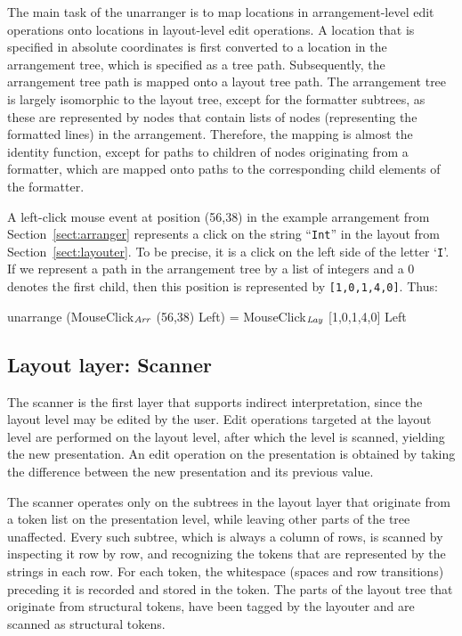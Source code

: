 \documentclass{speauth}
\begin{document}
The main task of the unarranger is to map locations in arrangement-level edit operations onto locations in layout-level edit operations. A location that is specified in absolute coordinates is first converted to a location in the arrangement tree, which is specified as a tree path. Subsequently, the arrangement tree path is mapped onto a layout tree path. The arrangement tree is largely isomorphic to the layout tree, except for the formatter subtrees, as these are represented by nodes that contain lists of nodes (representing the formatted lines) in the arrangement. Therefore, the mapping is almost the identity function, except for paths to children of nodes originating from a formatter, which are mapped onto paths to the corresponding child elements of the formatter.

A left-click mouse event at position (56,38) in the example arrangement from Section~\ref{sect:arranger} represents a click on the string ``\verb|Int|'' in the layout from Section~\ref{sect:layouter}. To be precise, it is a click on the left side of the letter `\verb|I|'. If we represent a path in the arrangement tree by a list of integers and a 0 denotes the first child, then this position is represented by \verb|[1,0,1,4,0]|. Thus:

\small \ttfamily
unarrange (MouseClick$_{\mathit{Arr}}$ (56,38) Left) = MouseClick$_{\mathit{Lay}}$ [1,0,1,4,0] Left
\rmfamily \normalsize


%																
\subsection{Layout layer: Scanner} \label{sect:scanner}


The scanner is the first layer that supports indirect interpretation, since the layout level may be edited by the user. Edit operations targeted at the layout level are performed on the layout level, after which the level is scanned, yielding the new presentation. An edit operation on the presentation is obtained by taking the difference between the new presentation and its previous value. 

The scanner operates only on the subtrees in the layout layer that originate from a token list on the presentation level, while leaving other parts of the tree unaffected. Every such subtree, which is always a column of rows, is scanned by inspecting it row by row, and recognizing the tokens that are represented by the strings in each row. For each token, the whitespace (spaces and row transitions) preceding it is recorded and stored in the token. The parts of the layout tree that originate from structural tokens, have been tagged by the layouter and are scanned as structural tokens.
\end{document}
